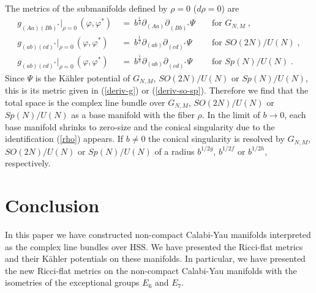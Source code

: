 \documentclass[a4paper,11pt]{article}
\newcommand{\del}{\partial}
\newcommand{\kahler}{K\"{a}hler }
\begin{document}
{The metrics of the submanifolds defined by 
$\rho = 0$ ($d \rho = 0$) are
\begin{align}
g_{(A a) (B b)^*}|_{\rho = 0}\,(\varphi,\varphi^*) 
 \ &= \ b^{\frac{1}{g}} \del_{(Aa)} \del_{(B b)^*} \Psi && \mbox{ for
 $G_{N,M}$} \; , \nonumber \\
g_{(a b) (c d)^*}|_{\rho = 0}\,(\varphi,\varphi^*)  
 \ &= \ b^{\frac{1}{f}} \del_{(a b)} \del_{(c d)^*} \Psi && \mbox{ for
 $SO(2N)/U(N)$} \; , \\
g_{(a b) (c d)^*}|_{\rho = 0}\,(\varphi,\varphi^*)  
 \ &= \ b^{\frac{1}{h}} \del_{(a b)} \del_{(c d)^*}\Psi && \mbox{ for
 $Sp(N)/U(N)$} \; . \nonumber
\end{align}
Since $\Psi$ is the \kahler potential of 
$G_{N,M}$, $SO(2N)/U(N)$ or $Sp(N)/U(N)$,  
this is its metric given in  
(\ref{deriv-g}) or (\ref{deriv-so-sp}). 
Therefore we find that 
the total space is the complex line bundle 
over $G_{N,M}$, $SO(2N)/U(N)$ or $Sp(N)/U(N)$ as 
a base manifold
with the fiber $\rho$.
In the limit of $b \to 0$, each base manifold shrinks to zero-size  
and the conical singularity due to the identification 
(\ref{rho}) appears. 
If $b\neq 0$ the conical singularity is resolved by
$G_{N,M}$, $SO(2N)/U(N)$ or $Sp(N)/U(N)$ of a radius $b^{1/2g}$,
$b^{1/2f}$ or $b^{1/2h}$, respectively. 


\section{Conclusion} \label{conclusion}

In this paper 
we have constructed non-compact Calabi-Yau manifolds
interpreted as the complex line bundles over HSS.
We have presented the Ricci-flat metrics and their \kahler
potentials on these manifolds.
In particular, we have presented the new Ricci-flat metrics on
the non-compact Calabi-Yau manifolds with the isometries 
of the exceptional groups $E_6$ and $E_7$. 

}
\end{document}
